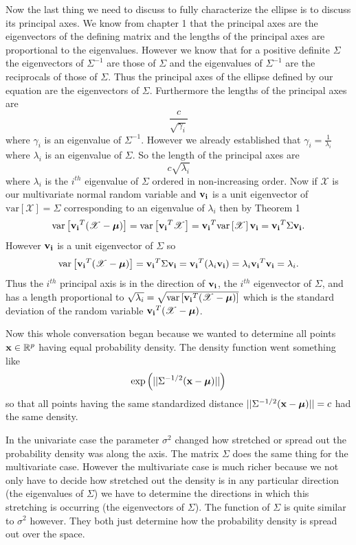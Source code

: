 \documentclass{book}
\newcommand{\bs}[1]{\boldsymbol{#1}}
\newcommand{\rv}[1]{\bs{\mathscr{#1}}}
\begin{document}
Now the last thing we need to discuss to fully characterize the ellipse is to discuss its principal axes. We know from chapter 1 that the principal axes are the eigenvectors of the defining matrix and the lengths of the principal axes are proportional to the eigenvalues. However we know that for a positive definite $\Sigma$ the eigenvectors of $\Sigma^{-1}$ are those of $\Sigma$ and the eigenvalues of $\Sigma^{-1}$ are the reciprocals of those of $\Sigma$. Thus the principal axes of the ellipse defined by our equation are the eigenvectors of $\Sigma$. Furthermore the lengths of the principal axes are 
$$
\frac{c}{\sqrt{\gamma_i}}
$$
where $\gamma_i$ is an eigenvalue of $\Sigma^{-1}$. However we already established that $\gamma_i=\frac{1}{\lambda_i}$ where $\lambda_i$ is an eigenvalue of $\Sigma$. So the length of the principal axes are
$$
c\sqrt{\lambda_i}
$$
where $\lambda_i$ is the $i^{th}$ eigenvalue of $\Sigma$ ordered in non-increasing order. Now if $\rv{X}$ is our multivariate normal random variable and ${\bf v_i}$ is a unit  eigenvector of $\text{var}\left[\rv{X}\right]=\Sigma$ corresponding to an eigenvalue of $\lambda_i$ then by Theorem 1 
$$
\text{var}\left[{\bf v_i}^T(\rv{X}-\bs{\mu})\right]=\text{var}\left[{\bf v_i}^T\rv{X}\right]={\bf v_i}^T\text{var}\left[\rv{X}\right]{\bf v_i}={\bf v_i}^T\Sigma{\bf v_i}.
$$
However ${\bf v_i}$ is a unit eigenvector of $\Sigma$ so 
$$
\text{var}\left[{\bf v_i}^T(\rv{X}-\bs{\mu})\right]={\bf v_i}^T\Sigma{\bf v_i}={\bf v_i}^T(\lambda_i{\bf v_i})=\lambda_i{\bf v_i}^T{\bf v_i}=\lambda_i.
$$
Thus the $i^{th}$ principal axis is in the direction of ${\bf v_i}$, the $i^{th}$ eigenvector of $\Sigma$, and has a length proportional to $\sqrt{\lambda_i}=\sqrt{\text{var}\left[{\bf v_i}^T(\rv{X}-\bs{\mu})\right]}$ which is the standard deviation of the random variable ${\bf v_i}^T(\rv{X}-\bs{\mu})$. 

Now this whole conversation began because we wanted to determine all points ${\bf x}\in\mathbb{R}^p$ having equal probability density. The density function went something like
$$
\text{exp}\left(||\Sigma^{-1/2}({\bf x}-\bs{\mu})||\right)
$$
so that all points having the same standardized distance $||\Sigma^{-1/2}({\bf x}-\bs{\mu})||=c$ had the same density. 

 In the univariate case the parameter $\sigma^2$ changed how stretched or spread out the probability density was along the axis. The matrix $\Sigma$ does the same thing for the multivariate case. However the multivariate case is much richer because we not only have to decide how stretched out the density is in any particular direction (the eigenvalues of $\Sigma$) we have to determine the directions in which this stretching is occurring (the eigenvectors of $\Sigma$). The function of $\Sigma$ is quite similar to $\sigma^2$ however. They both just determine how the probability density is spread out over the space. 
\end{document}

